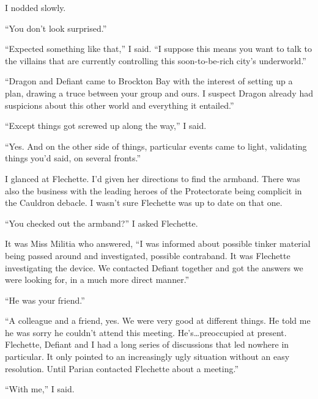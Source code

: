 I nodded slowly.



``You don't look surprised.''



``Expected something like that,'' I said.  ``I suppose this means you want to talk to the villains that are currently controlling this soon-to-be-rich city's underworld.''



``Dragon and Defiant came to Brockton Bay with the interest of setting up a plan, drawing a truce between your group and ours.  I suspect Dragon already had suspicions about this other world and everything it entailed.''



``Except things got screwed up along the way,'' I said.



``Yes.  And on the other side of things, particular events came to light, validating things you'd said, on several fronts.''



I glanced at Flechette.  I'd given her directions to find the armband.  There was also the business with the leading heroes of the Protectorate being complicit in the Cauldron debacle.  I wasn't sure Flechette was up to date on that one.



``You checked out the armband?''  I asked Flechette.



It was Miss Militia who answered, ``I was informed about possible tinker material being passed around and investigated, possible contraband.  It was Flechette investigating the device.  We contacted Defiant together and got the answers we were looking for, in a much more direct manner.''



``He was your friend.''



``A colleague and a friend, yes.  We were very good at different things.  He told me he was sorry he couldn't attend this meeting.  He's\ldots preoccupied at present.  Flechette, Defiant and I had a long series of discussions that led nowhere in particular.  It only pointed to an increasingly ugly situation without an easy resolution.  Until Parian contacted Flechette about a meeting.''



``With me,'' I said.



